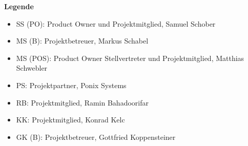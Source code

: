 \textbf{Legende}
\begin{itemize}[leftmargin=4.5mm]
    \item{SS (PO):} Product Owner und Projektmitglied, Samuel Schober
    \item{MS (B):} Projektbetreuer, Markus Schabel
    \item{MS (POS):}  Product Owner Stellvertreter und Projektmitglied, Matthias Schwebler
    \item{PS:} Projektpartner, Ponix Systems
    \item{RB:} Projektmitglied, Ramin Bahadoorifar
    \item{KK:} Projektmitglied, Konrad Kelc
    \item{GK (B):} Projektbetreuer, Gottfried Koppensteiner
\end{itemize}

\newpage